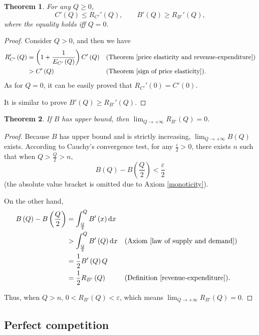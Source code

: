 \documentclass{article}
\newtheorem{theorem}{Theorem}[subsection]
\begin{document}
\begin{theorem}
\label{inequality of revenue-expenditure and supply and demand}
For any $Q\ge0$,
$$C'\left(Q\right)\le R_{C'}'\left(Q\right),
\qquad B'\left(Q\right)\ge R_{B'}'\left(Q\right),$$
where the equality holds iff $Q=0$.
\end{theorem}
\begin{proof}
Consider $Q>0$, and then we have
\begin{align*}
R_{C'}'\left(Q\right)&=\left(1+\frac1{E_{C'}\left(Q\right)}\right)C'\left(Q\right)&&\text{(Theorem \ref{price elasticity and revenue-expenditure})}\\
&>C'\left(Q\right)&&\text{(Theorem \ref{sign of price elasticity})}.
\end{align*}
As for $Q=0$, it can be easily proved that $R_{C'}'\left(0\right)=C'\left(0\right)$.

It is similar to prove $B'\left(Q\right)\ge R_{B'}'\left(Q\right)$.
\end{proof}

\begin{theorem}
If $B$ has upper bound, then $\lim_{Q\to+\infty}R_{B'}\left(Q\right)=0$.
\end{theorem}
\begin{proof}
Because $B$ has upper bound and is strictly increasing, $\lim_{Q\to+\infty}B\left(Q\right)$ exists.
According to Cauchy's convergence test, for any $\frac\varepsilon2>0$, there exists $n$ such that
when $Q>\frac Q2>n$,
$$B\left(Q\right)-B\left(\frac Q2\right)<\frac\varepsilon2$$
(the absolute value bracket is omitted due to Axiom \ref{monoticity}).

On the other hand,
\begin{align*}
B\left(Q\right)-B\left(\frac Q2\right)&=\int_{\frac Q2}^QB'\left(x\right)\mathrm dx\\
&>\int_{\frac Q2}^QB'\left(Q\right)\mathrm dx&&\text{(Axiom \ref{law of supply and demand})}\\
&=\frac12B'\left(Q\right)Q\\
&=\frac12R_{B'}\left(Q\right)&&\text{(Definition \ref{revenue-expenditure})}.
\end{align*}

Thus, when $Q>n$, $0<R_{B'}\left(Q\right)<\varepsilon$, which means $\lim_{Q\to+\infty}R_{B'}\left(Q\right)=0$.
\end{proof}

\subsection{Perfect competition}
\label{perfect competition}
\end{document}
